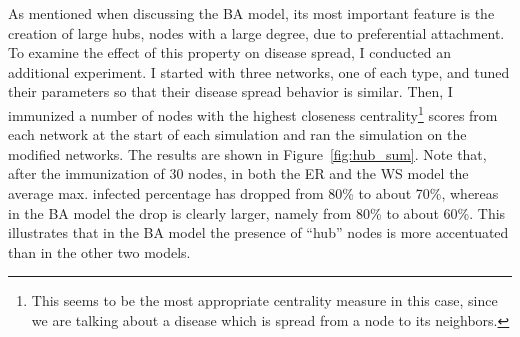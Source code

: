 \documentclass[11pt]{article} %
\begin{document}
As mentioned when discussing the BA model, its most important feature
is the creation of large hubs, nodes with a large degree, due to
preferential attachment. To examine the effect of this property
on disease spread, I conducted an additional experiment. I started
with three networks, one of each type, and tuned their parameters
so that their disease spread behavior is similar. Then, I immunized
a number of nodes with the highest closeness
centrality\footnote{This seems to be the most appropriate centrality
measure in this case, since we are talking about a disease which is
spread from a node to its neighbors.}
scores from
each network at the start of each simulation and ran the simulation
on the modified networks. The results are shown in
Figure~\ref{fig:hub_sum}. Note that, after the immunization of 30 nodes,
in both the ER and the WS model the average max. infected percentage
has dropped from 80\% to about 70\%, whereas in the BA model the
drop is clearly larger, namely from 80\% to about 60\%. This illustrates
that in the BA model the presence of ``hub'' nodes is more accentuated
than in the other two models.
\end{document}
